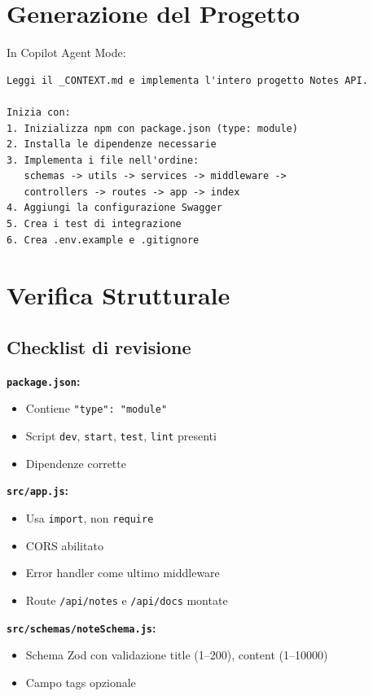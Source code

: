 \section{Generazione del Progetto}

\begin{praticabox}[title={Pratica --- Inizializzazione e generazione}]
In Copilot Agent Mode:
\begin{lstlisting}[language={}]
Leggi il _CONTEXT.md e implementa l'intero progetto Notes API.

Inizia con:
1. Inizializza npm con package.json (type: module)
2. Installa le dipendenze necessarie
3. Implementa i file nell'ordine:
   schemas -> utils -> services -> middleware ->
   controllers -> routes -> app -> index
4. Aggiungi la configurazione Swagger
5. Crea i test di integrazione
6. Crea .env.example e .gitignore
\end{lstlisting}
\end{praticabox}

\section{Verifica Strutturale}

\subsection*{Checklist di revisione}

\textbf{\texttt{package.json}:}
\begin{itemize}
  \item Contiene \texttt{"type": "module"}
  \item Script \texttt{dev}, \texttt{start}, \texttt{test}, \texttt{lint} presenti
  \item Dipendenze corrette
\end{itemize}

\textbf{\texttt{src/app.js}:}
\begin{itemize}
  \item Usa \texttt{import}, non \texttt{require}
  \item CORS abilitato
  \item Error handler come ultimo middleware
  \item Route \texttt{/api/notes} e \texttt{/api/docs} montate
\end{itemize}

\textbf{\texttt{src/schemas/noteSchema.js}:}
\begin{itemize}
  \item Schema Zod con validazione title (1--200), content (1--10000)
  \item Campo tags opzionale
\end{itemize}

